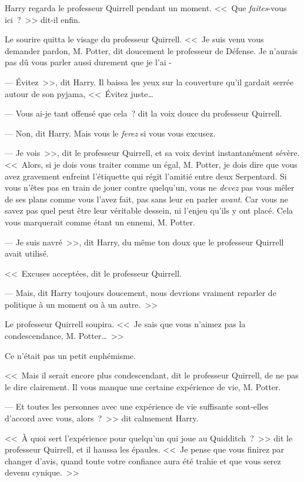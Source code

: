 Harry regarda le professeur Quirrell pendant un moment. <<~Que \emph{faites}-vous ici~?~>> dit-il enfin.

Le sourire quitta le visage du professeur Quirrell. <<~Je suis venu vous demander pardon, M. Potter, dit doucement le professeur de Défense. Je n'aurais pas dû vous parler aussi durement que je l'ai -

--- Évitez~>>, dit Harry. Il baissa les yeux sur la couverture qu'il gardait serrée autour de son pyjama, <<~Évitez juste…

--- Vous ai-je tant offensé que cela~? dit la voix douce du professeur Quirrell.

--- Non, dit Harry. Mais vous le \emph{ferez} si vous vous excusez.

--- Je vois~>>, dit le professeur Quirrell, et sa voix devint instantanément sévère. <<~Alors, si je dois vous traiter comme un égal, M. Potter, je dois dire que vous avez gravement enfreint l'étiquette qui régit l'amitié entre deux Serpentard. Si vous n'êtes pas en train de jouer contre quelqu'un, vous ne \emph{devez} pas vous mêler de ses plans comme vous l'avez fait, pas sans leur en parler \emph{avant}. Car vous ne savez pas quel peut être leur véritable dessein, ni l'enjeu qu'ils y ont placé. Cela vous marquerait comme étant un ennemi, M. Potter.

--- Je suis navré~>>, dit Harry, du même ton doux que le professeur Quirrell avait utilisé.

<<~Excuses acceptées, dit le professeur Quirrell.

--- Mais, dit Harry toujours doucement, nous devrions vraiment reparler de politique à un moment ou à un autre.~>>

Le professeur Quirrell soupira. <<~Je sais que vous n'aimez pas la condescendance, M. Potter…~>>

Ce n'était pas un petit euphémisme.

<<~Mais il serait encore plus condescendant, dit le professeur Quirrell, de ne pas le dire clairement. Il vous manque une certaine expérience de vie, M. Potter.

--- Et toutes les personnes avec une expérience de vie suffisante sont-elles d'accord avec vous, alors~?~>> dit calmement Harry.

<<~À quoi sert l'expérience pour quelqu'un qui joue au Quidditch~?~>> dit le professeur Quirrell, et il haussa les épaules. <<~Je pense que vous finirez par changer d'avis, quand toute votre confiance aura été trahie et que vous serez devenu cynique.~>>

